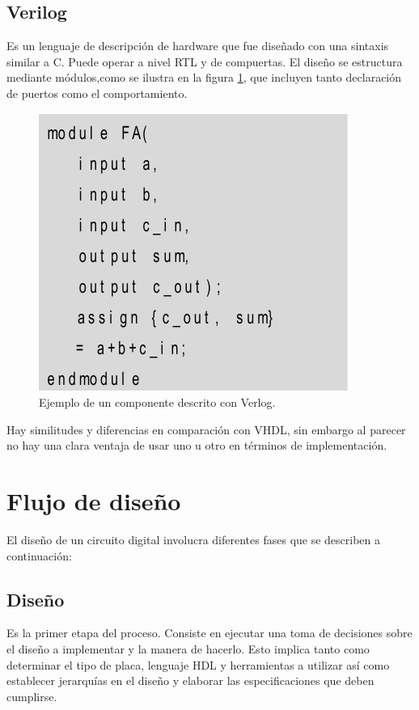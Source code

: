 \subsection{Verilog}
Es un lenguaje de descripción de hardware que fue diseñado con una sintaxis similar a C. Puede operar a nivel RTL y de compuertas. El diseño se estructura mediante módulos,como se ilustra en la figura \ref{componente verilog}, que incluyen tanto declaración de puertos como el comportamiento.

\begin{figure}
\centering
\includegraphics[scale=.5]{./Figures/verilog_ejemplo.png}
\caption{Ejemplo de un componente descrito con Verlog.}
\label{componente verilog}
\end{figure}


Hay similitudes y diferencias en comparación con VHDL, sin embargo al parecer no hay una clara ventaja de usar uno u otro en términos de implementación.



\section{Flujo de diseño}
El diseño de un circuito digital involucra diferentes fases que se describen a continuación:

\subsection{Diseño}
Es la primer etapa del proceso. Consiste en ejecutar una toma de decisiones sobre el diseño a implementar y la manera de hacerlo. Esto implica tanto como determinar el tipo de placa, lenguaje HDL y herramientas a utilizar así como establecer jerarquías en el diseño y elaborar las especificaciones que deben cumplirse.


